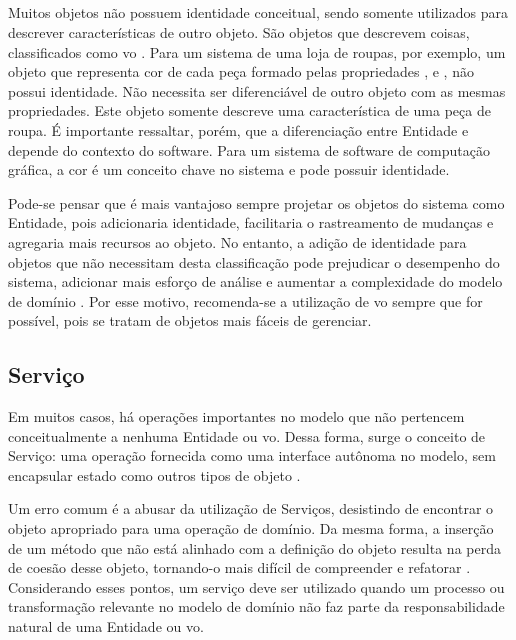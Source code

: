 \subsection{}
Muitos objetos não possuem identidade conceitual, sendo somente utilizados para descrever características de outro objeto. São objetos que descrevem coisas, classificados como \acrfull{vo} \cite{evans2004ddd}. Para um sistema de uma loja de roupas, por exemplo, um objeto que representa cor de cada peça formado pelas propriedades ,  e , não possui identidade. Não necessita ser diferenciável de outro objeto com as mesmas propriedades. Este objeto somente descreve uma característica de uma peça de roupa. É importante ressaltar, porém, que a diferenciação entre Entidade e  depende do contexto do software. Para um sistema de software de computação gráfica, a cor é um conceito chave no sistema e pode possuir identidade.

Pode-se pensar que é mais vantajoso sempre projetar os objetos do sistema como Entidade, pois adicionaria identidade, facilitaria o rastreamento de mudanças e agregaria mais recursos ao objeto. No entanto, a adição de identidade para objetos que não necessitam desta classificação pode prejudicar o desempenho do sistema, adicionar mais esforço de análise e aumentar a complexidade do modelo de domínio \cite{evans2004ddd}. Por esse motivo, recomenda-se a utilização de \acrshort{vo} sempre que for possível, pois se tratam de objetos mais fáceis de gerenciar.

\subsection{}


\subsection{Serviço}
Em muitos casos, há operações importantes no modelo que não pertencem conceitualmente a nenhuma Entidade ou \acrshort{vo}. Dessa forma, surge o conceito de Serviço: uma operação fornecida como uma interface autônoma no modelo, sem encapsular estado como outros tipos de objeto \cite{evans2004ddd}.

Um erro comum é a abusar da utilização de Serviços, desistindo de encontrar o objeto apropriado para uma operação de domínio. Da mesma forma, a inserção de um método que não está alinhado com a definição do objeto resulta na perda de coesão desse objeto, tornando-o mais difícil de compreender e refatorar \cite{evans2004ddd}. Considerando esses pontos, um serviço deve ser utilizado quando um processo ou transformação relevante no modelo de domínio não faz parte da responsabilidade natural de uma Entidade ou \acrshort{vo}.

